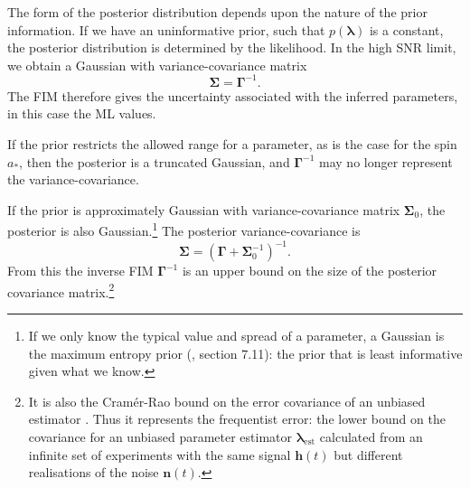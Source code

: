 \documentclass[useAMS,usedcolumn,usegraphicx,usenatbib]{mn2e}
\newcommand{\sub}[1]{\ensuremath{_\mathrm{#1}}}
\begin{document}
The form of the posterior distribution depends upon the nature of the prior information. If we have an uninformative prior, such that $p(\boldsymbol{\lambda})$ is a constant, the posterior distribution is determined by the likelihood. In the high SNR limit, we obtain a Gaussian with variance-covariance matrix
\begin{equation}
\boldsymbol{\Sigma} = \boldsymbol{\Gamma}^{-1}.
\label{eq:InvFisher}
\end{equation}
The FIM therefore gives the uncertainty associated with the inferred parameters, in this case the ML values.

If the prior restricts the allowed range for a parameter, as is the case for the spin $a_\ast$, then the posterior is a truncated Gaussian, and $\boldsymbol{\Gamma}^{-1}$ may no longer represent the variance-covariance.

If the prior is approximately Gaussian with variance-covariance matrix $\boldsymbol{\Sigma}_0$, the posterior is also Gaussian.\footnote{If we only know the typical value and spread of a parameter, a Gaussian is the maximum entropy prior (\citealt{Jaynes2003}, section 7.11): the prior that is least informative given what we know.} The posterior variance-covariance is \citep{Cutler1994, Vallisneri2008}
\begin{equation}
\boldsymbol{\Sigma} = \left(\boldsymbol{\Gamma} + \boldsymbol{\Sigma}_0^{-1}\right)^{-1}.
\label{eq:Posterior_variance}
\end{equation}
From this the inverse FIM $\boldsymbol{\Gamma}^{-1}$ is an upper bound on the size of the posterior covariance matrix.\footnote{It is also the Cram\'{e}r-Rao bound on the error covariance of an unbiased estimator \citep{Cutler1994, Vallisneri2008}. Thus it represents the frequentist error: the lower bound on the covariance for an unbiased parameter estimator $\boldsymbol{\lambda}\sub{est}$ calculated from an infinite set of experiments with the same signal $\boldsymbol{h}(t)$ but different realisations of the noise $\boldsymbol{n}(t)$.}
\end{document}
